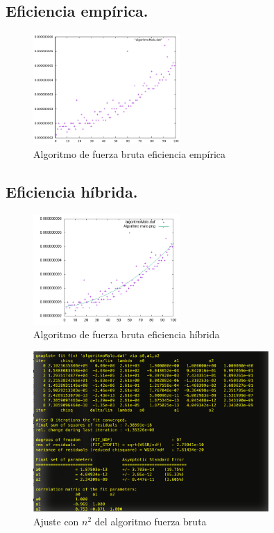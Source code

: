 \documentclass[a4paper, 11pt]{article}
\begin{document}
\subsection{Eficiencia empírica.}
\begin{figure}[!hbp]
	\includegraphics[width=0.5\textwidth]{algoritmoMalo.png}
	\caption{Algoritmo de fuerza bruta eficiencia empírica	\label{Algoritmo fuerza bruta empírico}}
\end{figure}
\subsection{Eficiencia híbrida.}
\begin{figure}[!hbp]
	\includegraphics[width=0.5\textwidth]{algoritmoMaloAjuste.png}
	\caption{Algoritmo de fuerza bruta eficiencia híbrida	\label{Algoritmo fuerza bruta hibrido}}
\end{figure}

\begin{figure}[!htp]
	\includegraphics[width=0.8\textwidth]{maloajuste}
	\caption{Ajuste con $n^2$ del algoritmo fuerza bruta\label{AJustemal}}
\end{figure}
\pagebreak
\end{document}
